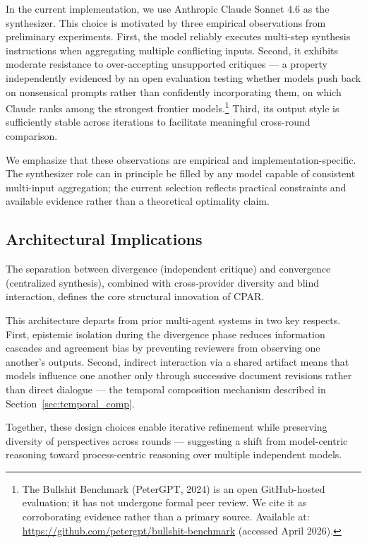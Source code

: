\documentclass[11pt, a4paper]{article}
\begin{document}
In the current implementation, we use Anthropic Claude Sonnet 4.6 as the synthesizer. This choice is motivated by three empirical observations from preliminary experiments. First, the model reliably executes multi-step synthesis instructions when aggregating multiple conflicting inputs. Second, it exhibits moderate resistance to over-accepting unsupported critiques --- a property independently evidenced by an open evaluation testing whether models push back on nonsensical prompts rather than confidently incorporating them, on which Claude ranks among the strongest frontier models.\footnote{The Bullshit Benchmark (PeterGPT, 2024) is an open GitHub-hosted evaluation; it has not undergone formal peer review. We cite it as corroborating evidence rather than a primary source. Available at: \url{https://github.com/petergpt/bullshit-benchmark} (accessed April 2026).} Third, its output style is sufficiently stable across iterations to facilitate meaningful cross-round comparison.

We emphasize that these observations are empirical and implementation-specific. The synthesizer role can in principle be filled by any model capable of consistent multi-input aggregation; the current selection reflects practical constraints and available evidence rather than a theoretical optimality claim.

\subsection{Architectural Implications}

The separation between divergence (independent critique) and convergence (centralized synthesis), combined with cross-provider diversity and blind interaction, defines the core structural innovation of CPAR.

This architecture departs from prior multi-agent systems in two key respects. First, epistemic isolation during the divergence phase reduces information cascades and agreement bias by preventing reviewers from observing one another's outputs. Second, indirect interaction via a shared artifact means that models influence one another only through successive document revisions rather than direct dialogue --- the temporal composition mechanism described in Section~\ref{sec:temporal_comp}.

Together, these design choices enable iterative refinement while preserving diversity of perspectives across rounds --- suggesting a shift from model-centric reasoning toward process-centric reasoning over multiple independent models.
\end{document}
